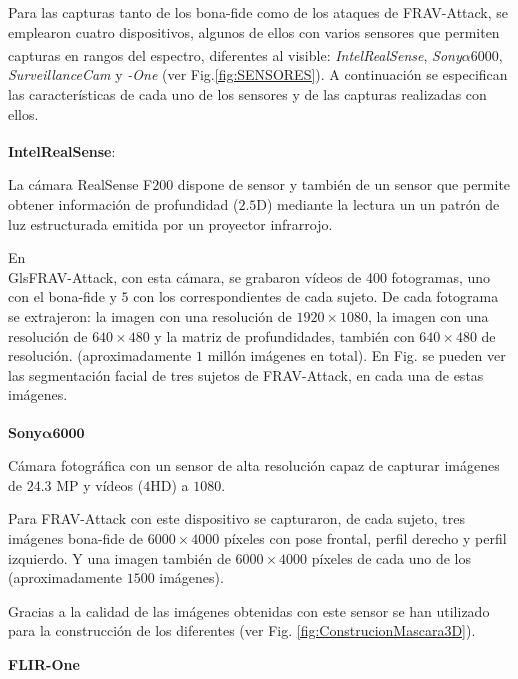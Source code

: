 Para las capturas tanto de los \gls{bona-fide} como de los ataques de \Gls{FRAV-Attack}, se emplearon cuatro dispositivos, algunos de ellos con varios sensores que permiten capturas en rangos del espectro, diferentes al visible: \textit{Intel\textsuperscript{\textregistered}RealSense\textsuperscript{\texttrademark}}, \textit{Sony\textsuperscript{\textregistered}$\alpha6000$}, \textit{SurveillanceCam} y \textit{-One} (ver Fig.\ref{fig:SENSORES}). A continuación se especifican las características de cada uno de los sensores y de las capturas realizadas con ellos. 

\medskip
\textbf{Intel\textsuperscript{\textregistered}RealSense\textsuperscript{\texttrademark}}:

La cámara RealSense F$200$ \cite{RealSenseOnline} dispone de sensor  y también de un sensor  que permite obtener información de profundidad ($2.5$D) mediante la lectura un un patrón de luz estructurada emitida por un proyector infrarrojo.

En \\Gls{FRAV-Attack}, con esta cámara, se grabaron vídeos de 400 fotogramas, uno con el \gls{bona-fide} y $5$ con los  correspondientes de cada sujeto. De cada fotograma se extrajeron: la imagen  con una resolución de $1920\times1080$, la imagen  con una resolución de $640\times480$ y la matriz de profundidades, también con $640\times480$ de resolución. (aproximadamente $1$ millón imágenes en total). En Fig.  se pueden ver las segmentación facial de tres sujetos de \Gls{FRAV-Attack}, en cada una de estas imágenes.

\medskip
\textbf{Sony\textsuperscript{\textregistered}$\mathbf{\alpha6000}$}

Cámara fotográfica con un sensor  de alta resolución capaz de capturar imágenes de $24.3$ MP y vídeos ($4$HD) a $1080$. 

Para \Gls{FRAV-Attack} con este dispositivo se capturaron, de cada sujeto, tres imágenes \gls{bona-fide} de $6000\times4000$ píxeles con pose frontal, perfil derecho y perfil izquierdo. Y una imagen también de $6000\times4000$ píxeles de cada uno de los  (aproximadamente $1500$ imágenes). 

Gracias a la calidad de las imágenes obtenidas con este sensor se han utilizado para la construcción de los diferentes  (ver Fig. \ref{fig:ConstrucionMascara3D}). 

\medskip
\textbf{\gls{FLIR}-One} 

